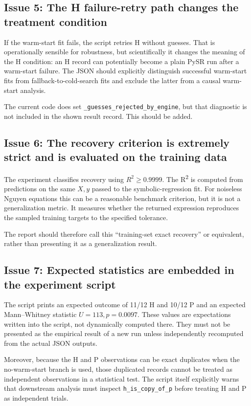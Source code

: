 \documentclass[11pt]{article}
\begin{document}
\subsection{Issue 5: The H failure-retry path changes the treatment condition}

If the warm-start fit fails, the script retries H without guesses. That is operationally sensible for robustness, but scientifically it changes the meaning of the H condition: an H record can potentially become a plain PySR run after a warm-start failure. The JSON should explicitly distinguish successful warm-start fits from fallback-to-cold-search fits and exclude the latter from a causal warm-start analysis.

The current code does set \texttt{\_guesses\_rejected\_by\_engine}, but that diagnostic is not included in the shown result record. This should be added.

\subsection{Issue 6: The recovery criterion is extremely strict and is evaluated on the training data}

The experiment classifies recovery using \(R^2\ge0.9999\). The R\textsuperscript{2} is computed from predictions on the same \(X,y\) passed to the symbolic-regression fit. For noiseless Nguyen equations this can be a reasonable benchmark criterion, but it is not a generalization metric. It measures whether the returned expression reproduces the sampled training targets to the specified tolerance.

The report should therefore call this ``training-set exact recovery'' or equivalent, rather than presenting it as a generalization result.

\subsection{Issue 7: Expected statistics are embedded in the experiment script}

The script prints an expected outcome of 11/12 H and 10/12 P and an expected Mann--Whitney statistic \(U=113,p=0.0097\). These values are expectations written into the script, not dynamically computed there. They must not be presented as the empirical result of a new run unless independently recomputed from the actual JSON outputs.

Moreover, because the H and P observations can be exact duplicates when the no-warm-start branch is used, those duplicated records cannot be treated as independent observations in a statistical test. The script itself explicitly warns that downstream analysis must inspect \texttt{h\_is\_copy\_of\_p} before treating H and P as independent trials.
\end{document}
